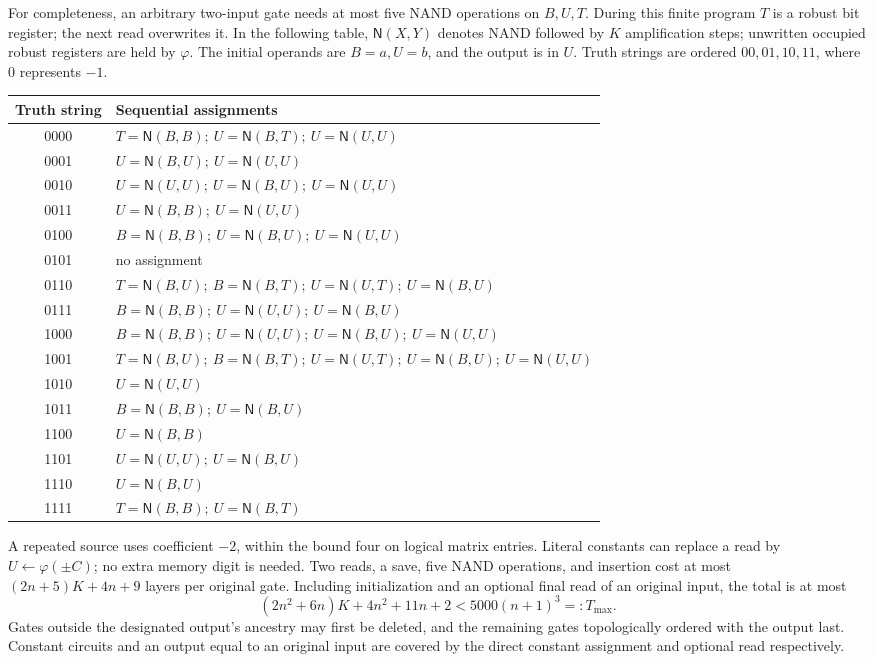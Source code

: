 \documentclass[11pt]{article}
\theoremstyle{remark}
\begin{document}
For completeness, an arbitrary two-input gate needs at most five NAND
operations on $B,U,T$. During this finite program $T$ is a robust bit
register; the next read overwrites it. In the following table,
$\mathsf N(X,Y)$ denotes NAND followed by $K$ amplification steps;
unwritten occupied robust registers are held by $\varphi$.
The initial operands are $B=a,U=b$, and the output is in $U$.
Truth strings are ordered $00,01,10,11$, where $0$ represents $-1$.
\begin{center}\small
\begin{tabular}{c l}
\hline
Truth string & Sequential assignments\\\hline
0000 & $T=\mathsf N(B,B);\ U=\mathsf N(B,T);\ U=\mathsf N(U,U)$\\
0001 & $U=\mathsf N(B,U);\ U=\mathsf N(U,U)$\\
0010 & $U=\mathsf N(U,U);\ U=\mathsf N(B,U);\ U=\mathsf N(U,U)$\\
0011 & $U=\mathsf N(B,B);\ U=\mathsf N(U,U)$\\
0100 & $B=\mathsf N(B,B);\ U=\mathsf N(B,U);\ U=\mathsf N(U,U)$\\
0101 & no assignment\\
0110 & $T=\mathsf N(B,U);\ B=\mathsf N(B,T);\ U=\mathsf N(U,T);\ U=\mathsf N(B,U)$\\
0111 & $B=\mathsf N(B,B);\ U=\mathsf N(U,U);\ U=\mathsf N(B,U)$\\
1000 & $B=\mathsf N(B,B);\ U=\mathsf N(U,U);\ U=\mathsf N(B,U);\ U=\mathsf N(U,U)$\\
1001 & $T=\mathsf N(B,U);\ B=\mathsf N(B,T);\ U=\mathsf N(U,T);\ U=\mathsf N(B,U);\ U=\mathsf N(U,U)$\\
1010 & $U=\mathsf N(U,U)$\\
1011 & $B=\mathsf N(B,B);\ U=\mathsf N(B,U)$\\
1100 & $U=\mathsf N(B,B)$\\
1101 & $U=\mathsf N(U,U);\ U=\mathsf N(B,U)$\\
1110 & $U=\mathsf N(B,U)$\\
1111 & $T=\mathsf N(B,B);\ U=\mathsf N(B,T)$\\\hline
\end{tabular}
\end{center}
A repeated source uses coefficient $-2$, within the bound four on
logical matrix entries. Literal constants can replace a read by
$U\leftarrow\varphi(\pm C)$; no extra memory digit is needed.
Two reads, a save, five NAND operations, and insertion cost at most
$(2n+5)K+4n+9$ layers per original gate. Including initialization and
an optional final read of an original input, the total is at most
\[
 (2n^2+6n)K+4n^2+11n+2<5000(n+1)^3=:T_{\max}.
\]
Gates outside the designated output's ancestry may first be deleted,
and the remaining gates topologically ordered with the output last.
Constant circuits and an output equal to an original input are covered
by the direct constant assignment and optional read respectively.
\end{document}
